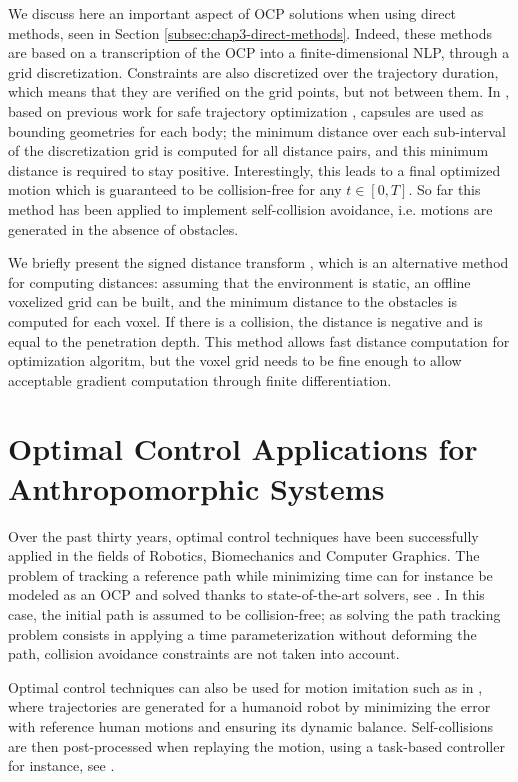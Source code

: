 We discuss here an important aspect of OCP solutions when using direct
methods, seen in Section \ref{subsec:chap3-direct-methods}. Indeed,
these methods are based on a transcription of the OCP into a
finite-dimensional NLP, through a grid discretization. Constraints are
also discretized over the trajectory duration, which means that they
are verified on the grid points, but not between them. In
\cite{lee2012accurate}, based on previous work for safe trajectory
optimization \cite{Lengagne2010}, capsules are used as bounding
geometries for each body; the minimum distance over each sub-interval
of the discretization grid is computed for all distance pairs, and
this minimum distance is required to stay positive. Interestingly,
this leads to a final optimized motion which is guaranteed to be
collision-free for any $t\in[0,T]$. So far this method has been
applied to implement self-collision avoidance, i.e. motions are
generated in the absence of obstacles.

We briefly present the signed distance transform
\cite{felzenszwalb2004distance}, which is an alternative method for
computing distances: assuming that the environment is static, an
offline voxelized grid can be built, and the minimum distance to the
obstacles is computed for each voxel. If there is a collision, the
distance is negative and is equal to the penetration depth. This
method allows fast distance computation for optimization algoritm, but
the voxel grid needs to be fine enough to allow acceptable gradient
computation through finite differentiation.

\section{Optimal Control Applications for Anthropomorphic Systems}

Over the past thirty years, optimal control techniques have been
successfully applied in the fields of Robotics, Biomechanics and
Computer Graphics. The problem of tracking a reference path while
minimizing time can for instance be modeled as an OCP and solved
thanks to state-of-the-art solvers, see
\cite{bobrow1985time,verscheure2009time,suleiman2010time}. In this
case, the initial path is assumed to be collision-free; as solving the
path tracking problem consists in applying a time parameterization
without deforming the path, collision avoidance constraints are not
taken into account.

Optimal control techniques can also be used for motion imitation such
as in \cite{suleiman2008human}, where trajectories are generated for a
humanoid robot by minimizing the error with reference human motions
and ensuring its dynamic balance. Self-collisions are then
post-processed when replaying the motion, using a task-based
controller for instance, see \cite{kanehiro2008local}.

